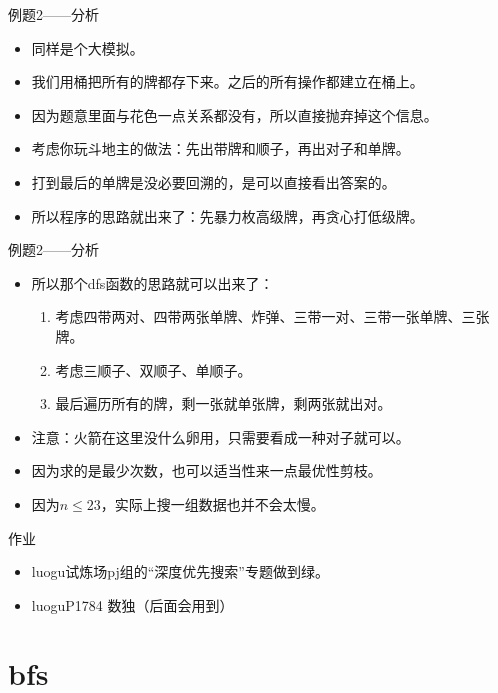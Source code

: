 \documentclass{beamer}[UTF-8]
\begin{document}
\begin{frame}{例题2——分析}
  \pause
\begin{itemize}
\item 同样是个大模拟。 \pause
\item 我们用桶把所有的牌都存下来。之后的所有操作都建立在桶上。 \pause
\item 因为题意里面与花色一点关系都没有，所以直接抛弃掉这个信息。 \pause
\item 考虑你玩斗地主的做法：先出带牌和顺子，再出对子和单牌。 \pause
\item 打到最后的单牌是没必要回溯的，是可以直接看出答案的。 \pause
\item 所以程序的思路就出来了：先暴力枚高级牌，再贪心打低级牌。
\end{itemize}
\end{frame}

\begin{frame}{例题2——分析}
  \pause
\begin{itemize}
\item 所以那个dfs函数的思路就可以出来了： \pause
\begin{enumerate}
  \item 考虑四带两对、四带两张单牌、炸弹、三带一对、三带一张单牌、三张牌。 \pause
  \item 考虑三顺子、双顺子、单顺子。 \pause
  \item 最后遍历所有的牌，剩一张就单张牌，剩两张就出对。 \pause
\end{enumerate}
\item 注意：火箭在这里没什么卵用，只需要看成一种对子就可以。 \pause
\item 因为求的是最少次数，也可以适当性来一点最优性剪枝。 \pause
\item 因为$n \leq 23$，实际上搜一组数据也并不会太慢。
\end{itemize}
\end{frame}

\begin{frame}{作业}
\begin{itemize}
  \item luogu试炼场pj组的“深度优先搜索”专题做到绿。
  \item luoguP1784 数独（后面会用到）
\end{itemize}
\end{frame}

\section{bfs}
\end{document}
